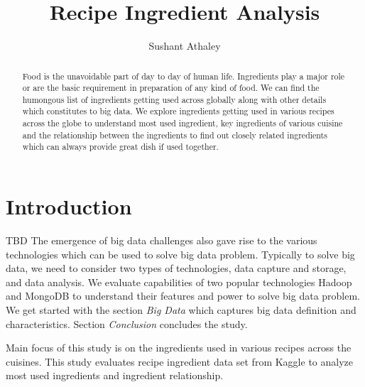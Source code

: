 \documentclass[sigconf]{acmart}
\begin{document}
\title{Recipe Ingredient Analysis}


\author{Sushant Athaley}

\renewcommand{\shortauthors}{G. v. Laszewski}


\begin{abstract}
Food is the unavoidable part of day to day of human life. Ingredients play a major role or are the basic requirement in preparation of any kind of food. We can find the humongous list of ingredients getting used across globally along with other details which constitutes to big data. We explore ingredients getting used in various recipes across the globe to understand most used ingredient, key ingredients of various cuisine and the relationship between the ingredients to find out closely related ingredients which can always provide great dish if used together.
\end{abstract}


\maketitle

\section{Introduction}
TBD
The emergence of big data challenges also gave rise to the various technologies which can be used to solve big data problem. Typically to solve big data, we need to consider two types of technologies, data capture and storage, and data analysis. We evaluate capabilities of two popular technologies Hadoop and MongoDB to understand their features and power to solve big data problem. We get started with the section \emph{Big Data} which captures big data definition and characteristics. Section \emph{Conclusion} concludes the study. 

Main focus of this study is on the ingredients used in various recipes across the cuisines. This study evaluates recipe ingredient data set from Kaggle \cite{www-kaggle} to analyze most used ingredients and ingredient relationship.
\end{document}
